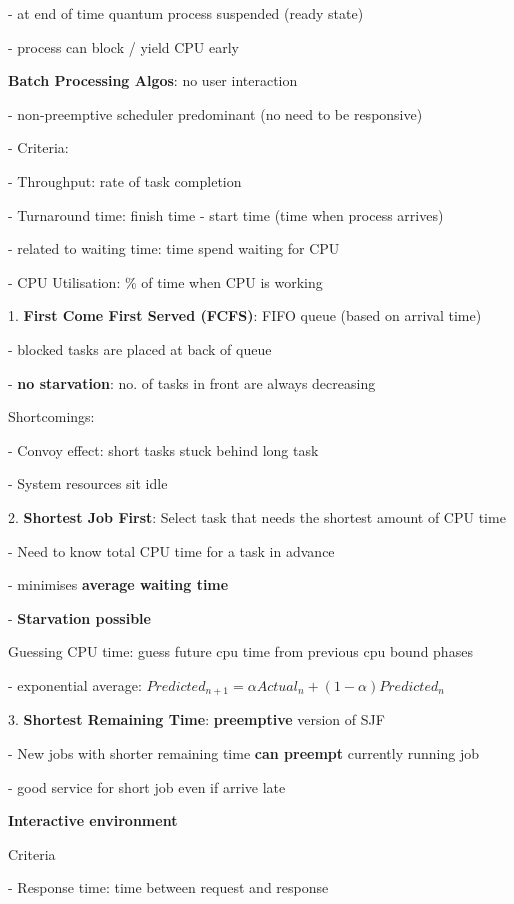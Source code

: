 \documentclass[10pt, a4paper]{article}
\newcommand{\highlight}[1]{{\color{red}\textbf{#1}}}
\newcommand{\red}[1]{{\color{red}#1}}
\newcommand{\tab}[0]{\hspace*{2mm}}
\begin{document}
\begin{multicols*}{3}
		\tab{} - at end of \red{time quantum} process suspended (ready state)

		\tab{} - process can block / yield CPU early

		\textbf{Batch Processing Algos}: no user interaction
		
		- non-preemptive scheduler predominant (no need to be responsive)

		- Criteria:

		\tab{} - Throughput: rate of task completion

		\tab{} - Turnaround time: finish time - start time (time when process arrives)

		\tab{}\tab{} - related to \red{waiting time}: time spend waiting for CPU

		\tab{} - CPU Utilisation: \% of time when CPU is working

		1. \textbf{First Come First Served (FCFS)}: FIFO queue (based on arrival time)

		- blocked tasks are placed at back of queue

		- \highlight{no starvation}: no. of tasks in front are always decreasing

		Shortcomings:

		\tab{} - Convoy effect: short tasks stuck behind long task

		\tab{} - System resources sit idle

		2. \textbf{Shortest Job First}: Select task that needs the shortest amount of CPU time

		- Need to know \red{total CPU time} for a task in advance

		- minimises \highlight{average waiting time}

		- \highlight{Starvation possible}

		Guessing CPU time: guess future cpu time from previous cpu bound phases

		\tab{} - exponential average: $Predicted_{n+1} = \alpha Actual_n + (1 - \alpha)Predicted_n$

		3. \textbf{Shortest Remaining Time}: \highlight{preemptive} version of SJF

		- New jobs with shorter remaining time \highlight{can preempt} currently running job

		- good service for short job even if arrive late

		\textbf{Interactive environment}

		Criteria

		\tab{} - Response time: time between request and response


\end{multicols*}
\end{document}
